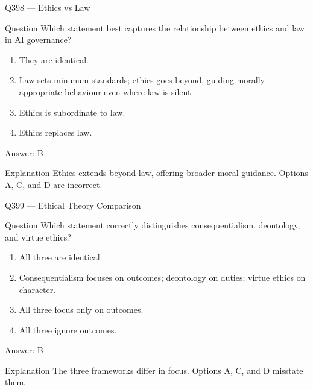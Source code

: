 \documentclass[aspectratio=169,8pt]{beamer}
\begin{document}
	\begin{frame}{Q398 --- Ethics vs Law}
		\begin{block}{Question}
			Which statement best captures the relationship between ethics and law in AI governance?
			\begin{enumerate}
				\item They are identical.
				\item Law sets minimum standards; ethics goes beyond, guiding morally appropriate behaviour even where law is silent.
				\item Ethics is subordinate to law.
				\item Ethics replaces law.
			\end{enumerate}
		\end{block}
		\begin{exampleblock}{Answer: B}\end{exampleblock}
		\begin{block}{Explanation}
			Ethics extends beyond law, offering broader moral guidance. Options A, C, and D are incorrect.
		\end{block}
	\end{frame}
	
	\begin{frame}{Q399 --- Ethical Theory Comparison}
		\begin{block}{Question}
			Which statement correctly distinguishes consequentialism, deontology, and virtue ethics?
			\begin{enumerate}
				\item All three are identical.
				\item Consequentialism focuses on outcomes; deontology on duties; virtue ethics on character.
				\item All three focus only on outcomes.
				\item All three ignore outcomes.
			\end{enumerate}
		\end{block}
		\begin{exampleblock}{Answer: B}\end{exampleblock}
		\begin{block}{Explanation}
			The three frameworks differ in focus. Options A, C, and D misstate them.
		\end{block}
	\end{frame}
	
\end{document}

